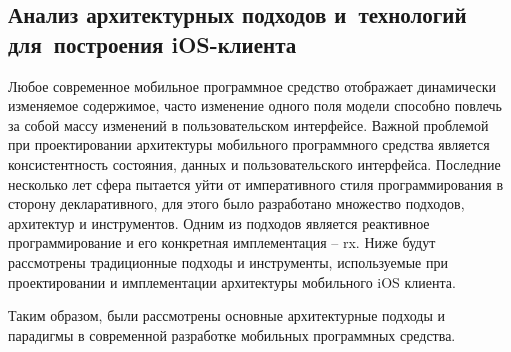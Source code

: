 \subsection{Анализ архитектурных подходов и~технологий для~построения iOS-клиента}
\label{sec:analysis:research:mobArch}

Любое современное мобильное программное средство отображает динамически изменяемое содержимое, часто изменение одного поля модели способно повлечь за собой массу изменений в пользовательском интерфейсе. Важной проблемой при проектировании архитектуры мобильного программного средства является консистентность состояния, данных и пользовательского интерфейса. Последние несколько лет сфера пытается уйти от императивного стиля программирования в сторону декларативного, для этого было разработано множество подходов, архитектур и инструментов. Одним из подходов является реактивное программирование и его конкретная имплементация -- \gls{rx}. Ниже будут рассмотрены традиционные подходы и инструменты, используемые при проектировании и имплементации архитектуры мобильного iOS клиента.








Таким образом, были рассмотрены основные архитектурные подходы и парадигмы в современной разработке мобильных программных средства.